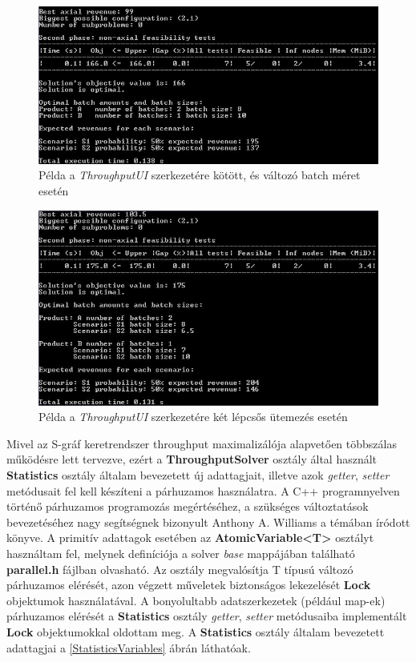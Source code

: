 \begin{figure}[H]
\begin{center}
\includegraphics[scale=0.9]{throughputUIFixedVar}
\caption{Példa a \textit{ThroughputUI} szerkezetére kötött, és változó batch méret esetén}
\label{ThroughputUIFixedVar}
\end{center}
\end{figure}
\begin{figure}[H]
\begin{center}
\includegraphics[scale=0.9]{throughputUITwoStage}
\caption{Példa a \textit{ThroughputUI} szerkezetére két lépcsős ütemezés esetén}
\label{ThroughputUITwoStage}
\end{center}
\end{figure}
Mivel az S-gráf keretrendszer throughput maximalizálója alapvetően többszálas működésre lett tervezve, ezért a \textbf{ThroughputSolver} osztály által használt \textbf{Statistics} osztály általam bevezetett új adattagjait, illetve azok \textit{getter}, \textit{setter} metódusait fel kell készíteni a párhuzamos használatra. A C++ programnyelven történő párhuzamos programozás megértéséhez, a szükséges változtatások bevezetéséhez nagy segítségnek bizonyult Anthony A. Williams a témában íródott könyve. \cite{CppConcurrency} A primitív adattagok esetében az \textbf{AtomicVariable\textless T\textgreater } osztályt használtam fel, melynek definíciója a solver \textit{base} mappájában található \textbf{parallel.h} fájlban olvasható. Az osztály megvalósítja T típusú változó párhuzamos elérését, azon végzett műveletek biztonságos lekezelését \textbf{Lock} objektumok használatával. A bonyolultabb adatszerkezetek (például map-ek) párhuzamos elérését a \textbf{Statistics} osztály \textit{getter}, \textit{setter} metódusaiba implementált \textbf{Lock} objektumokkal oldottam meg. A \textbf{Statistics} osztály általam bevezetett adattagjai a \ref{StatisticsVariables} ábrán láthatóak.
